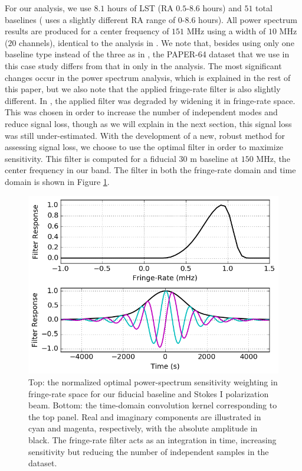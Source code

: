 \documentclass[preprint2,numberedappendix,tighten]{aastex6}  %
\begin{document}
For our analysis, we use $8.1$ hours of LST (RA $0.5$-$8.6$ hours) and $51$ total baselines ( uses a slightly different RA 
range of $0$-$8.6$ hours). All power spectrum results are produced for a center frequency of $151$ MHz using a width of $10$ 
MHz ($20$ channels), identical to the analysis in . We note that, besides using only one baseline type instead of the three as in 
, the PAPER-64 dataset that we use in this case study differs from that in  only in the analysis. The most significant changes occur in the power spectrum analysis, which is explained in the rest of this paper, but we also note that the applied fringe-rate filter is also slightly different. In , the 
applied filter was degraded by widening it in fringe-rate space. This was chosen in order to increase the number of independent 
modes and reduce signal loss, though as we will explain in the next section, this signal loss was still under-estimated. With the development of a new, 
robust method for assessing signal loss, we choose to use the optimal filter in order to maximize sensitivity. This filter is 
computed for a fiducial $30$ m baseline at $150$ MHz, the center frequency in our band. The filter in both the fringe-rate 
domain and time domain is shown in Figure \ref{fig:frp}.

\begin{figure}
	\centering
	\includegraphics[width=\columnwidth]{plots/frp.png}
	\caption{Top: the normalized optimal power-spectrum sensitivity weighting in fringe-rate space for our fiducial baseline and 
Stokes I polarization beam. Bottom: the time-domain convolution kernel corresponding to the top panel. Real and imaginary 
components are illustrated in cyan and magenta, respectively, with the absolute amplitude in black. The fringe-rate filter acts as 
an integration in time, increasing sensitivity but reducing the number of independent samples in the dataset.}
	\label{fig:frp}
\end{figure}
\end{document}
